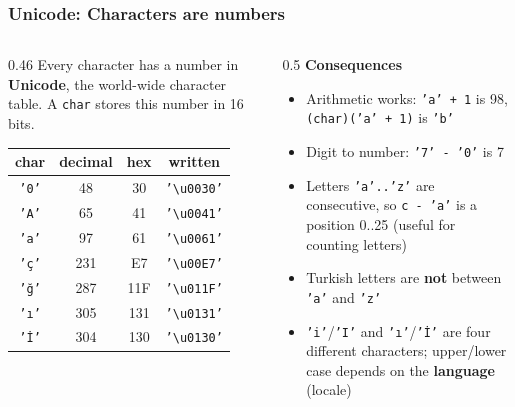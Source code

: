 \documentclass[aspectratio=169,10pt,compress]{beamer}
\begin{document}
\begin{frame}[t,fragile] \frametitle{Unicode: Characters are numbers}
  \begin{columns}[T]
    \begin{column}{0.46\textwidth}
      \small Every character has a number in \textbf{Unicode}, the world-wide character table.
      A \texttt{char} stores this number in 16 bits.

      \vspace{0.4em}
      \begin{tabular}{@{}cccc@{}}
        \toprule
        \textbf{char} & \textbf{decimal} & \textbf{hex} & \textbf{written} \\
        \midrule
        \texttt{'0'} & 48  & 30  & \texttt{'\textbackslash u0030'} \\
        \texttt{'A'} & 65  & 41  & \texttt{'\textbackslash u0041'} \\
        \texttt{'a'} & 97  & 61  & \texttt{'\textbackslash u0061'} \\
        \texttt{'ç'} & 231 & E7  & \texttt{'\textbackslash u00E7'} \\
        \texttt{'ğ'} & 287 & 11F & \texttt{'\textbackslash u011F'} \\
        \texttt{'ı'} & 305 & 131 & \texttt{'\textbackslash u0131'} \\
        \texttt{'İ'} & 304 & 130 & \texttt{'\textbackslash u0130'} \\
        \bottomrule
      \end{tabular}
    \end{column}
    \begin{column}{0.5\textwidth}
      \textbf{Consequences}
      \begin{itemize}\small
        \item Arithmetic works: \texttt{'a' + 1} is 98, \texttt{(char)('a' + 1)} is \texttt{'b'}
        \item Digit to number: \texttt{'7' - '0'} is 7
        \item Letters \texttt{'a'..'z'} are consecutive, so \texttt{c - 'a'} is a position 0..25
              (useful for counting letters)
        \item Turkish letters are \textbf{not} between \texttt{'a'} and \texttt{'z'}
        \item \texttt{'i'}/\texttt{'I'} and \texttt{'ı'}/\texttt{'İ'} are four different characters;
              upper/lower case depends on the \textbf{language} (locale)
      \end{itemize}
    \end{column}
  \end{columns}
\end{frame}
\end{document}
